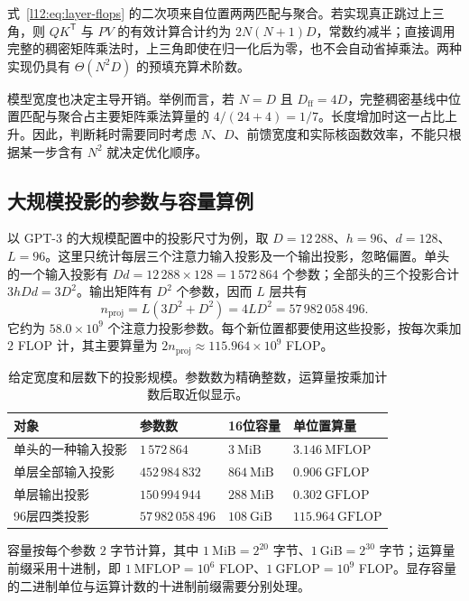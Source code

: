 式~\eqref{l12:eq:layer-flops} 的二次项来自位置两两匹配与聚合。若实现真正跳过上三角，则 $QK^{\mathsf T}$ 与 $PV$ 的有效计算合计约为 $2N(N+1)D$，常数约减半；直接调用完整的稠密矩阵乘法时，上三角即使在归一化后为零，也不会自动省掉乘法。两种实现仍具有 $\Theta(N^2D)$ 的预填充算术阶数。

模型宽度也决定主导开销。举例而言，若 $N=D$ 且 $D_{\mathrm{ff}}=4D$，完整稠密基线中位置匹配与聚合占主要矩阵乘法算量的 $4/(24+4)=1/7$。长度增加时这一占比上升。因此，判断耗时需要同时考虑 $N$、$D$、前馈宽度和实际核函数效率，不能只根据某一步含有 $N^2$ 就决定优化顺序。

\subsection{大规模投影的参数与容量算例}

以 GPT-3 的大规模配置中的投影尺寸为例，取 $D=12\,288$、$h=96$、$d=128$、$L=96$。这里只统计每层三个注意力输入投影及一个输出投影，忽略偏置。单头的一个输入投影有 $Dd=12\,288\times128=1\,572\,864$ 个参数；全部头的三个投影合计 $3hDd=3D^2$。输出矩阵有 $D^2$ 个参数，因而 $L$ 层共有
\begin{equation}
 n_{\mathrm{proj}}=L(3D^2+D^2)
 =4LD^2
 =57\,982\,058\,496.
 \label{l12:eq:gpt3-params}
\end{equation}
它约为 $58.0\times10^9$ 个注意力投影参数。每个新位置都要使用这些投影，按每次乘加 $2$ FLOP 计，其主要算量为 $2n_{\mathrm{proj}}\approx115.964\times10^9$ FLOP。

\begin{table}[htbp]
\centering
\caption{给定宽度和层数下的投影规模。参数数为精确整数，运算量按乘加计数后取近似显示。}
\label{l12:tab:gpt3}
\small
\begin{tabularx}{\linewidth}{@{}Y L{3.6cm}L{2.6cm}L{3.3cm}@{}}
\toprule
对象 & 参数数 & 16位容量 & 单位置算量\\
\midrule
单头的一种输入投影 & $1\,572\,864$ & $3\ \mathrm{MiB}$ & $3.146\ \mathrm{MFLOP}$\\
单层全部输入投影 & $452\,984\,832$ & $864\ \mathrm{MiB}$ & $0.906\ \mathrm{GFLOP}$\\
单层输出投影 & $150\,994\,944$ & $288\ \mathrm{MiB}$ & $0.302\ \mathrm{GFLOP}$\\
96层四类投影 & $57\,982\,058\,496$ & $108\ \mathrm{GiB}$ & $115.964\ \mathrm{GFLOP}$\\
\bottomrule
\end{tabularx}
\end{table}

容量按每个参数 $2$ 字节计算，其中 $1\ \mathrm{MiB}=2^{20}$ 字节、$1\ \mathrm{GiB}=2^{30}$ 字节；运算量前缀采用十进制，即 $1\ \mathrm{MFLOP}=10^6$ FLOP、$1\ \mathrm{GFLOP}=10^9$ FLOP。显存容量的二进制单位与运算计数的十进制前缀需要分别处理。

